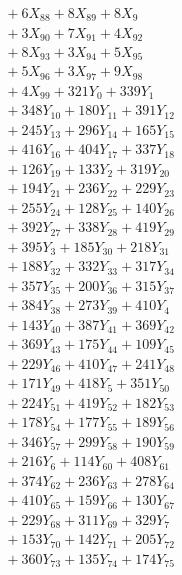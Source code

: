 \documentclass[a4paper,10pt]{article}
\begin{document}
{\begin{align}
&\quad  + 6X_{88} + 8X_{89} + 8X_{9} \\[0.5ex]
&\quad  + 3X_{90} + 7X_{91} + 4X_{92} \\[0.5ex]
&\quad  + 8X_{93} + 3X_{94} + 5X_{95} \\[0.5ex]
&\quad  + 5X_{96} + 3X_{97} + 9X_{98} \\[0.5ex]
&\quad  + 4X_{99} + 321Y_{0} + 339Y_{1} \\[0.5ex]
&\quad  + 348Y_{10} + 180Y_{11} + 391Y_{12} \\[0.5ex]
&\quad  + 245Y_{13} + 296Y_{14} + 165Y_{15} \\[0.5ex]
&\quad  + 416Y_{16} + 404Y_{17} + 337Y_{18} \\[0.5ex]
&\quad  + 126Y_{19} + 133Y_{2} + 319Y_{20} \\[0.5ex]
&\quad  + 194Y_{21} + 236Y_{22} + 229Y_{23} \\[0.5ex]
&\quad  + 255Y_{24} + 128Y_{25} + 140Y_{26} \\[0.5ex]
&\quad  + 392Y_{27} + 338Y_{28} + 419Y_{29} \\[0.5ex]
&\quad  + 395Y_{3} + 185Y_{30} + 218Y_{31} \\[0.5ex]
&\quad  + 188Y_{32} + 332Y_{33} + 317Y_{34} \\[0.5ex]
&\quad  + 357Y_{35} + 200Y_{36} + 315Y_{37} \\[0.5ex]
&\quad  + 384Y_{38} + 273Y_{39} + 410Y_{4} \\[0.5ex]
&\quad  + 143Y_{40} + 387Y_{41} + 369Y_{42} \\[0.5ex]
&\quad  + 369Y_{43} + 175Y_{44} + 109Y_{45} \\[0.5ex]
&\quad  + 229Y_{46} + 410Y_{47} + 241Y_{48} \\[0.5ex]
&\quad  + 171Y_{49} + 418Y_{5} + 351Y_{50} \\[0.5ex]
&\quad  + 224Y_{51} + 419Y_{52} + 182Y_{53} \\[0.5ex]
&\quad  + 178Y_{54} + 177Y_{55} + 189Y_{56} \\[0.5ex]
&\quad  + 346Y_{57} + 299Y_{58} + 190Y_{59} \\[0.5ex]
&\quad  + 216Y_{6} + 114Y_{60} + 408Y_{61} \\[0.5ex]
&\quad  + 374Y_{62} + 236Y_{63} + 278Y_{64} \\[0.5ex]
&\quad  + 410Y_{65} + 159Y_{66} + 130Y_{67} \\[0.5ex]
&\quad  + 229Y_{68} + 311Y_{69} + 329Y_{7} \\[0.5ex]
&\quad  + 153Y_{70} + 142Y_{71} + 205Y_{72} \\[0.5ex]
&\quad  + 360Y_{73} + 135Y_{74} + 174Y_{75} \\[0.5ex]

\end{align}}
\end{document}

